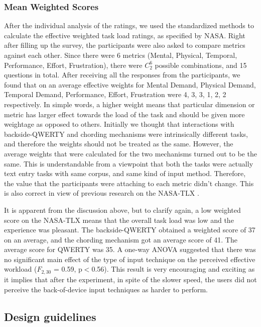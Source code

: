 \subsubsection{Mean Weighted Scores}
After the individual analysis of the ratings, we used the standardized methods to calculate the effective weighted task load ratings, as specified by NASA. Right after filling up the survey, the participants were also asked to compare metrics against each other. Since there were 6 metrics (Mental, Physical, Temporal, Performance, Effort, Frustration), there were $C_{2}^{6}$ possible combinations, and 15 questions in total. After receiving all the responses from the
participants, we found that on an average effective weights for Mental Demand, Physical Demand, Temporal Demand, Performance, Effort, Frustration were 4, 3, 3, 1, 2, 2 respectively. In simple words, a higher weight means that particular dimension or metric has larger effect towards the load of the task and should be given more weightage as opposed to others. Initially we thought that interactions with backside-QWERTY and chording mechanisms were intrinsically different tasks, and therefore the weights should not be treated as the same. However, the average weights that were calculated for the two mechanisms turned out to be the same. This is understandable from a viewpoint that both the tasks were actually text entry tasks with same corpus, and same kind of input method. Therefore, the value that the participants were attaching to each metric didn't change. This is also correct in view of previous research on the NASA-TLX \cite{HartS}.

It is apparent from the discussion above, but to clarify again, a low weighted score on the NASA-TLX means that the overall task load was low and the experience was pleasant. The backside-QWERTY obtained a weighted score of 37 on an average, and the chording mechanism got an average score of 41. The average score for QWERTY was 35. A one-way ANOVA suggested that there was no significant main effect of the type of input technique on the perceived effective workload ($F_{2,30}$ = 0.59, p$<$0.56). This result is very encouraging and exciting as it implies that after the experiment, in spite of the slower speed, the users did not perceive the back-of-device input techniques as harder to perform. 

\subsection{Design guidelines}


